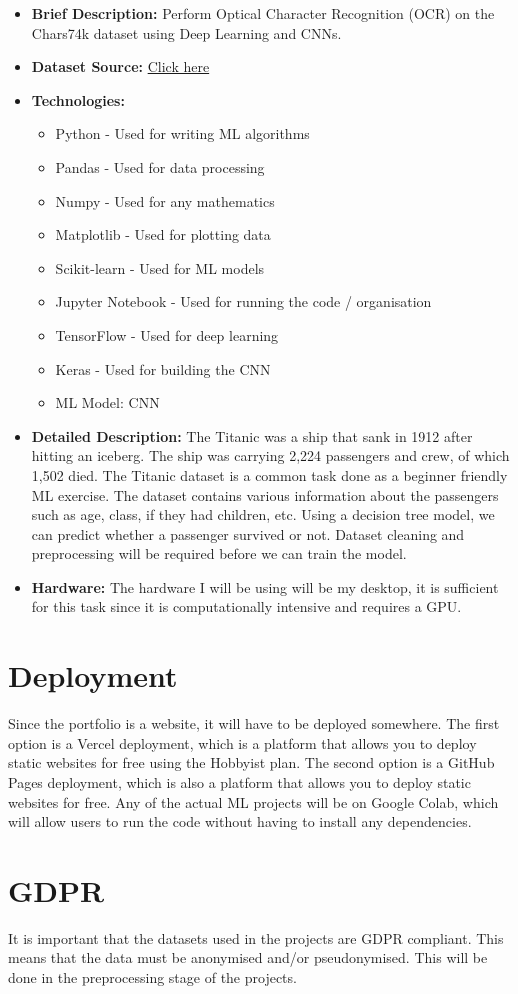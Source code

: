 \documentclass{article}
\begin{document}
\begin{itemize}
    \item \textbf{Brief Description:} Perform Optical Character Recognition (OCR) on the Chars74k dataset using Deep Learning and CNNs.
    \item \textbf{Dataset Source:} \href{https://web.stanford.edu/class/archive/cs/cs109/cs109.1166/problem12.html}{Click here}
    \item \textbf{Technologies:}
    \begin{itemize}
        \item Python - Used for writing ML algorithms
        \item Pandas - Used for data processing
        \item Numpy - Used for any mathematics
        \item Matplotlib - Used for plotting data
        \item Scikit-learn - Used for ML models
        \item Jupyter Notebook - Used for running the code / organisation
        \item TensorFlow - Used for deep learning
        \item Keras - Used for building the CNN
        \item ML Model: CNN
    \end{itemize}
    \item \textbf{Detailed Description:} The Titanic was a ship that sank in 1912 after hitting an iceberg. The ship was carrying 2,224 passengers and crew, of which 1,502 died. 
    The Titanic dataset is a common task done as a beginner friendly ML exercise. The dataset contains various information about the passengers such as age, class, if they had children, etc.
    Using a decision tree model, we can predict whether a passenger survived or not. Dataset cleaning and preprocessing will be required before we can train the model.
    \item \textbf{Hardware:} The hardware I will be using will be my desktop, it is sufficient for this task since it is computationally intensive and requires a GPU.
\end{itemize}

\section{Deployment}    
Since the portfolio is a website, it will have to be deployed somewhere. The first option is a Vercel deployment, 
which is a platform that allows you to deploy static websites for free using the Hobbyist plan. 
The second option is a GitHub Pages deployment, which is also a platform that allows you to deploy static websites for free. 
Any of the actual ML projects will be on Google Colab, which will allow users to run the code without having to install any dependencies.

\section{GDPR}
It is important that the datasets used in the projects are GDPR compliant. This means that the data must be anonymised and/or pseudonymised.
This will be done in the preprocessing stage of the projects.
\end{document}

